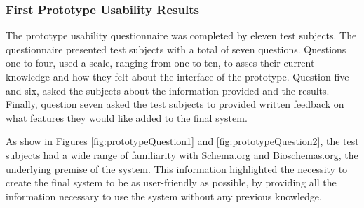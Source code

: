 \subsubsection{First Prototype Usability Results}
The prototype usability questionnaire was completed by eleven test subjects. The questionnaire presented test subjects with a total of seven questions. Questions one to four, used a scale, ranging from one to ten, to asses their current knowledge and how they felt about the interface of the prototype. Question five and six, asked the subjects about the information provided and the results. Finally, question seven asked the test subjects to provided written feedback on what features they would like added to the final system. 

As show in Figures \ref{fig:prototypeQuestion1} and \ref{fig:prototypeQuestion2}, the test subjects had a wide range of familiarity with Schema.org and Bioschemas.org, the underlying premise of the system. This information highlighted the necessity to create the final system to be as user-friendly as possible, by providing all the information necessary to use the system without any previous knowledge. \newline 
